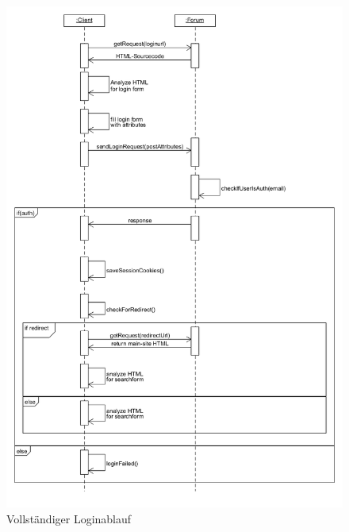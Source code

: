 	\begin{figure}[ht]
		\includegraphics[width=\textwidth,height=\textheight,keepaspectratio]{./diagrams/login_seq.png}
		\caption{Vollständiger Loginablauf}
	\end{figure}
	